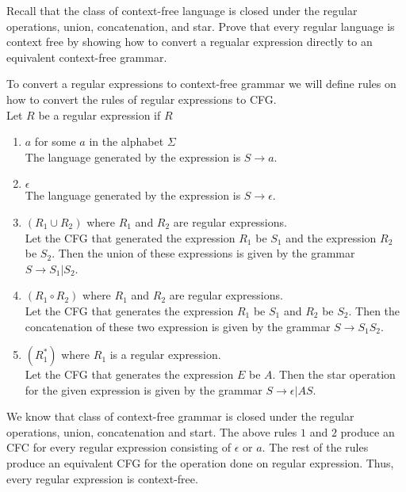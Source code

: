 \documentclass[12pt]{exam}
\begin{document}
\begin{questions}
\begin{solution}
  \end{solution}


  \question{} Recall that the class of context-free language is closed under the regular operations, union, concatenation, and star. Prove that every regular language is context free by showing how to convert a regualar expression directly to an equivalent context-free grammar.

  \begin{solution}
    To convert a regular expressions to context-free grammar we will define rules on how to convert the rules of regular expressions to CFG.\\
    Let $R$ be a regular expression if $R$
    \begin{enumerate}
      \item $a$ for some $a$ in the alphabet $\Sigma$\\
            The language generated by the expression is $S\to a$.
      \item $\epsilon$\\
            The language generated by the expression is $S\to \epsilon$.
      \item $(R_{1}\cup R_{2})$ where $R_{1}$ and $R_{2}$ are regular expressions.\\
            Let the CFG that generated the expression $R_{1}$ be $S_{1}$ and the expression $R_{2}$ be $S_{2}$. Then the union of these expressions is given by the grammar $S\to S_{1}|S_{2}$.
      \item $(R_{1} \circ R_{2})$ where $R_{1}$ and $R_{2}$ are regular expressions.\\
            Let the CFG that generates the expression $R_{1}$ be $S_{1}$ and $R_{2}$ be $S_{2}$. Then the concatenation of these two expression is given by the grammar $S\to S_{1}S_{2}$.
      \item $(R_{1}^{*})$ where $R_{1}$ is a regular expression.\\
            Let the CFG that generates the expression $E$ be $A$. Then the star operation for the given expression is given by the grammar $S\to \epsilon|AS$.
    \end{enumerate}

    We know that class of context-free grammar is closed under the regular operations, union, concatenation and start.
    The above rules $1$ and $2$ produce an CFC for every regular expression consisting of $\epsilon$ or $a$.
    The rest of the rules produce an equivalent CFG for the operation done on regular expression.
    Thus, every regular expression is context-free.



\end{solution}
\end{questions}
\end{document}
